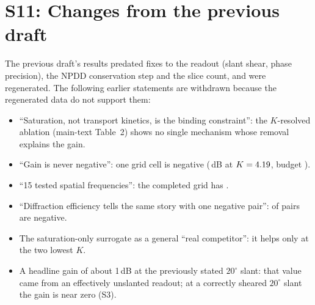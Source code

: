 \documentclass[10pt]{article}
\begin{document}
\section*{S11: Changes from the previous draft}
\label{sec:supp-s11}
The previous draft's results predated fixes to the readout (slant shear,
phase precision), the NPDD conservation step and the slice count, and were
regenerated. The following earlier statements are withdrawn because the
regenerated data do not support them:
\begin{itemize}
\item ``Saturation, not transport kinetics, is the binding constraint'': the
$K$-resolved ablation (main-text Table~2) shows no single mechanism whose
removal explains the gain.
\item ``Gain is never negative'': one grid cell is negative
(\MOneNegGain\,dB at $K=4.19$, budget \MOneNegBudget).
\item ``15 tested spatial frequencies'': the completed grid has \MOneNK.
\item ``Diffraction efficiency tells the same story with one negative pair'':
\DENNegative{} of \DENPairs{} pairs are negative.
\item The saturation-only surrogate as a general ``real competitor'': it
helps only at the two lowest $K$.
\item A headline gain of about 1\,dB at the previously stated $20^\circ$
slant: that value came from an effectively unslanted readout; at a
correctly sheared $20^\circ$ slant the gain is near zero (S3).
\end{itemize}



\end{document}
